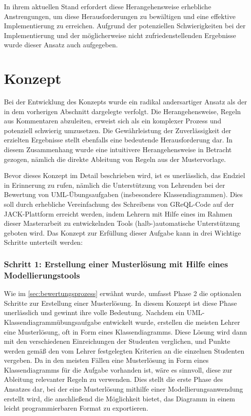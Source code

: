 In ihrem aktuellen Stand erfordert diese Herangehensweise erhebliche Anstrengungen, um diese Herausforderungen zu bewältigen und eine effektive Implementierung zu erreichen. Aufgrund der potenziellen Schwierigkeiten bei der Implementierung und der möglicherweise nicht zufriedenstellenden Ergebnisse wurde dieser Ansatz auch aufgegeben.

\section{Konzept}\label{sec:konzept}

Bei der Entwicklung des Konzepts wurde ein radikal andersartiger Ansatz als der in dem vorherigen Abschnitt dargelegte verfolgt. Die Herangehensweise, Regeln aus Kommentaren abzuleiten, erweist sich als ein komplexer Prozess und potenziell schwierig umzusetzen. Die Gewährleistung der Zuverlässigkeit der erzielten Ergebnisse stellt ebenfalls eine bedeutende Herausforderung dar. In diesem Zusammenhang wurde eine intuitivere Herangehensweise in Betracht gezogen, nämlich die direkte Ableitung von Regeln aus der Mustervorlage.

Bevor dieses Konzept im Detail beschrieben wird, ist es unerlässlich, das Endziel in Erinnerung zu rufen, nämlich die Unterstützung von Lehrenden bei der Bewertung von UML-Übungsaufgaben (insbesondere Klassendiagrammen). Dies soll durch erhebliche Vereinfachung des Schreibens von GReQL-Code auf der JACK-Plattform erreicht werden, indem Lehrern mit Hilfe eines im Rahmen dieser Masterarbeit zu entwickelnden Tools (halb-)automatische Unterstützung geboten wird. Das Konzept zur Erfüllung dieser Aufgabe kann in drei Wichtige Schritte unterteilt werden:

\subsubsection{Schritt 1: Erstellung einer Musterlösung mit Hilfe eines Modellierungstools}

Wie im \autoref{sec:bewertungsprozess} erwähnt wurde, umfasst Phase 2 die optionalen Schritte zur Erstellung einer Musterlösung. In diesem Konzept ist diese Phase unerlässlich und gewinnt ihre volle Bedeutung. Nachdem ein UML-Klassendiagrammübungsaufgabe entwickelt wurde, erstellen die meisten Lehrer eine Musterlösung, oft in Form eines Klassendiagramms. Diese Lösung wird dann mit den verschiedenen Einreichungen der Studenten verglichen, und Punkte werden gemäß den vom Lehrer festgelegten Kriterien an die einzelnen Studenten vergeben. Da in den meisten Fällen eine Musterlösung in Form eines Klassendiagramms für die Aufgabe vorhanden ist, wäre es sinnvoll, diese zur Ableitung relevanter Regeln zu verwenden. Dies stellt die erste Phase des Ansatzes dar, bei der eine Musterlösung mithilfe einer Modellierungsanwendung erstellt wird, die anschließend die Möglichkeit bietet, das Diagramm in einem leicht programmierbaren Format zu exportieren.


